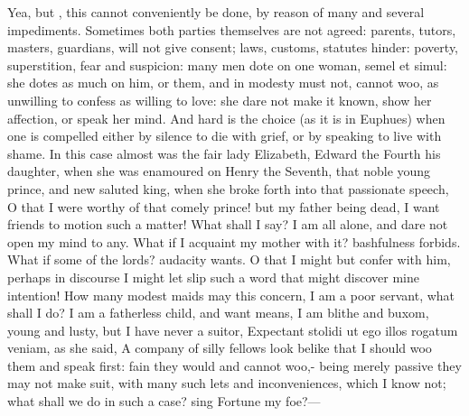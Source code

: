 Yea, but , this cannot conveniently be done, by
reason of many and several impediments. Sometimes both parties
themselves are not agreed: parents, tutors, masters, guardians, will
not give consent; laws, customs, statutes hinder: poverty,
superstition, fear and suspicion: many men dote on one woman, semel et
simul: she dotes as much on him, or them, and in modesty must not,
cannot woo, as unwilling to confess as willing to love: she dare not
make it known, show her affection, or speak her mind. And hard is the
choice (as it is in Euphues) when one is compelled either by silence to
die with grief, or by speaking to live with shame. In this case almost
was the fair lady Elizabeth, Edward the Fourth his daughter, when she
was enamoured on Henry the Seventh, that noble young prince, and new
saluted king, when she broke forth into that passionate speech, 
O that I were worthy of that comely prince! but my father being dead, I
want friends to motion such a matter! What shall I say? I am all alone,
and dare not open my mind to any. What if I acquaint my mother with it?
bashfulness forbids. What if some of the lords? audacity wants. O that
I might but confer with him, perhaps in discourse I might let slip such
a word that might discover mine intention! How many modest maids may
this concern, I am a poor servant, what shall I do? I am a fatherless
child, and want means, I am blithe and buxom, young and lusty, but I
have never a suitor, Expectant stolidi ut ego illos rogatum veniam, as
she said, A company of silly fellows look belike that I should
woo them and speak first: fain they would and cannot woo,- being merely passive they may not make suit, with
many such lets and inconveniences, which I know not; what shall we do
in such a case? sing Fortune my foe?---

